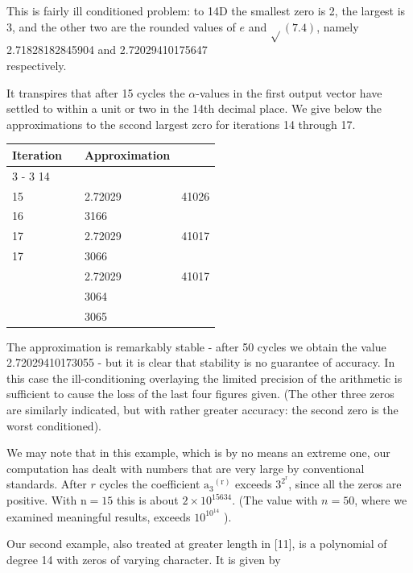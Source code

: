 \documentclass[10pt]{article}
\begin{document}
This is fairly ill conditioned problem: to 14D the smallest zero is 2, the largest is 3, and the other two are the rounded values of $e$ and $\sqrt{ }(7.4)$, namely\\
2.71828182845904 and 2.72029410175647\\
respectively.

It transpires that after 15 cycles the $\alpha$-values in the first output vector have settled to within a unit or two in the 14th decimal place. We give below the approximations to the sccond largest zcro for iterations 14 through 17.

\begin{center}
\begin{tabular}{llll}
Iteration &  & Approximation &  \\
\cline { 3 - 3 }\cline { 4 - 4 }
14 &  &  &  \\
15 &  & 2.72029 & 41026 \\
16 &  & 3166 &  \\
17 &  & 2.72029 & 41017 \\
17 &  & 3066 &  \\
 &  & 2.72029 & 41017 \\
 &  & 3064 &  \\
 &  & 3065 &  \\
\end{tabular}
\end{center}

The approximation is remarkably stable - after 50 cycles we obtain the value 2.72029410173055 - but it is clear that stability is no guarantee of accuracy. In this case the ill-conditioning overlaying the limited precision of the arithmetic is sufficient to cause the loss of the last four figures given. (The other three zeros are similarly indicated, but with rather greater accuracy: the second zero is the worst conditioned).

We may note that in this example, which is by no means an extreme one, our computation has dealt with numbers that are very large by conventional standards. After $r$ cycles the coefficient $\mathrm{a}_{3}{ }^{(\mathrm{r})}$ exceeds $3^{2^{\mathrm{r}}}$, since all the zeros are positive. With $\mathrm{n}=15$ this is about $2 \times 10^{15634}$. (The value with $n=50$, where we examined meaningful results, exceeds $10^{10^{14}}$ ).

Our second example, also treated at greater length in [11], is a polynomial of degree 14 with zeros of varying character. It is given by
\end{document}
